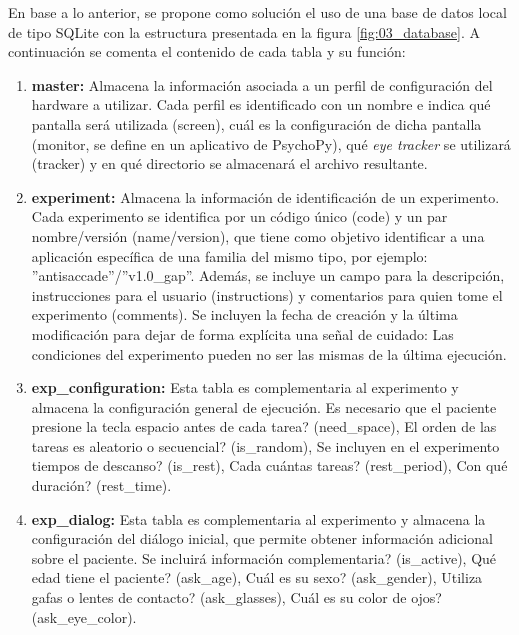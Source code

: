 \documentclass[\main/main.tex]{subfiles}
\begin{document}
		En base a lo anterior, se propone como solución el uso de una base de datos local de tipo SQLite con la estructura presentada en la figura \ref{fig:03_database}. A continuación se comenta el contenido de cada tabla y su función:
		\begin{enumerate}
			\item \textbf{master:} Almacena la información asociada a un perfil de configuración del hardware a utilizar. Cada perfil es identificado con un nombre e indica qué pantalla será utilizada (screen), cuál es la configuración de dicha pantalla (monitor, se define en un aplicativo de PsychoPy), qué \textit{eye tracker} se utilizará (tracker) y en qué directorio se almacenará el archivo resultante.

			\item \textbf{experiment:} Almacena la información de identificación de un experimento. Cada experimento se identifica por un código único (code) y un par nombre/versión (name/version), que tiene como objetivo identificar a una aplicación específica de una familia del mismo tipo, por ejemplo: ''antisaccade''/''v1.0\_gap''. Además, se incluye un campo para la descripción, instrucciones para el usuario (instructions) y comentarios para quien tome el experimento (comments). Se incluyen la fecha de creación y la última modificación para dejar de forma explícita una señal de cuidado: Las condiciones del experimento pueden no ser las mismas de la última ejecución.
			
			\item \textbf{exp\_configuration:} Esta tabla es complementaria al experimento y almacena la configuración general de ejecución. \textquestiondown Es necesario que el paciente presione la tecla espacio antes de cada tarea? (need\_space), \textquestiondown El orden de las tareas es aleatorio o secuencial? (is\_random), \textquestiondown Se incluyen en el experimento tiempos de descanso? (is\_rest), \textquestiondown Cada cuántas tareas? (rest\_period), \textquestiondown Con qué duración? (rest\_time).

			\item \textbf{exp\_dialog:} Esta tabla es complementaria al experimento y almacena la configuración del diálogo inicial, que permite obtener información adicional sobre el paciente. \textquestiondown Se incluirá información complementaria? (is\_active), \textquestiondown Qué edad tiene el paciente? (ask\_age), \textquestiondown Cuál es su sexo? (ask\_gender), \textquestiondown Utiliza gafas o lentes de contacto? (ask\_glasses), \textquestiondown Cuál es su color de ojos? (ask\_eye\_color).


\end{enumerate}
\end{document}
